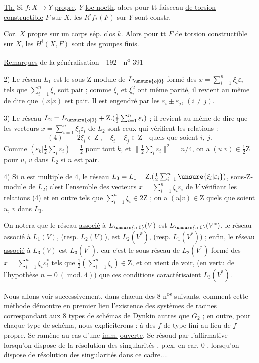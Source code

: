\uline{Th.} Si $f:X\to Y$ \uline{propre}, $Y$ \uline{loc noeth}, alors pour tt faisceau \uline{de torsion} \uline{constructible} $F$ sur $X$, les $R^if_*(F)$ sur $Y$ sont constr.

\uline{Cor.} $X$ propre sur un corps sép. clos $k$. Alors pour tt $F$ de torsion constructible sur $X$, les $H^i(X,F)$ sont des groupes finis.

\uline{Remarques}  de la généralisation
- 192 - \hfill n\textsuperscript{o} 391

2) Le réseau $L_1$ est le sous-$\mathrm Z$-module de $L_{\unsure{o|0}}$ formé des $x=\sum_{i=1}^n\xi_i\varepsilon_i$ tels que $\sum_{i=1}^n\xi_i$ soit \uline{pair} ; comme $\xi_i$ et $\xi_i^2$ ont même parité, il revient au même de dire que $(x|x)$ est \uline{pair}. Il est engendré par les $\varepsilon_i\pm\varepsilon_j$, $(i\neq j)$.

3) Le réseau $L_2=L_{\unsure{o|0}}+\mathrm Z.(\frac12\sum_{i=1}^n\varepsilon_i)$ ; il revient au même de dire que les vecteurs $x=\sum_{i=1}^n\xi_i\varepsilon_i$ de $L_2$ sont ceux qui vérifient les relations :
\[
(4)\qquad 2\xi_i\in\mathrm Z\ ,\quad\xi_i-\xi_j\in\mathrm Z\quad\text{quels que soient }i,\ j.
\]
Comme $(\varepsilon_k|\frac12\sum_i\varepsilon_i)=\frac12$ pour tout $k$, et $\|\frac12\sum_i\varepsilon_i\|^2=n/4$, on a $(u|v)\in\frac12\mathrm Z$ pour $u$, $v$ dans $L_2$ si $n$ est pair.

4) Si $n$ est \uline{multiple de} $4$, le réseau $L_3=L_1+\mathrm Z.(\frac12\sum_{i=1}^n\unsure{\xi_i|\varepsilon_i})$, sous-$\mathrm Z$-module de $L_2$; c'est l'ensemble des vecteurs $x=\sum_{i=1}^n\xi_i\varepsilon_i$ de $V$ vérifiant les relations (4) et en outre tels que $\sum_{i=1}^n\xi_i\in2\mathrm Z$ ; on a $(u|v)\in\mathrm Z$ quels que soient $u$, $v$ dans $L_3$.

On notera que le réseau \uline{associé} à $L_{\unsure{o|0}}(V)$ est $L_{\unsure{o|0}}(V^*)$, le réseau \uline{associé} à $L_1(V)$, (resp. $L_2(V)$), est $L_2(V^*)$, (resp. $L_1(V^*)$) ; enfin, le réseau \uline{associé} à $L_3(V)$ est $L_3(V^*)$, car c'est le sous-réseau de $L_2(V^*)$ formé des $x=\sum_{i=1}^n\xi_i\varepsilon_i^*$ tels que $\frac12(\sum_{i=1}^n\xi_i)\in\mathrm Z$, et on vient de voir, (en vertu de l'hypothèse $n\equiv0\ (\operatorname{mod.}4)$) que ces conditions caractérisaient $L_3(V^*)$.

Nous allons voir successivement, dans chacun des 8 n\textsuperscript{os} suivants, comment cette méthode démontre en premier lieu l'existence des systèmes de racines correspondant aux 8 types de schémas de Dynkin autres que $G_2$ ; en outre, pour chaque type de schéma, nous expliciterons :
à des $f$ de type fini au lieu de $f$ propre. Se ramène au cas d'une \uline{imm.} \uline{ouverte}. Se résoud par l'affirmative lorsqu'on dispose de la résolution des singularités , p.ex. en car. $0$ ,    lorsqu'on dispose de résolution des singularités  dans ce cadre....

